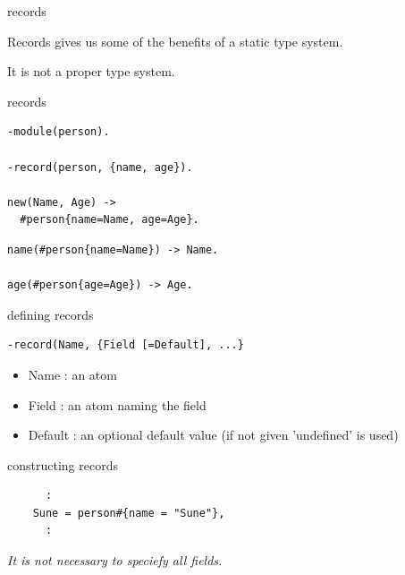 \begin{frame}{records}

\begin{center}
Records gives us some of the benefits of a static type system.
\end{center}
\pause\vspace{30pt}
\begin{center}
It is not a proper type system.
\end{center}
\end{frame}

\begin{frame}[fragile]{records}

\begin{verbatim}
-module(person).

-record(person, {name, age}).

new(Name, Age) ->
  #person{name=Name, age=Age}.
\end{verbatim}
\pause
\begin{verbatim}
name(#person{name=Name}) -> Name.

age(#person{age=Age}) -> Age.
\end{verbatim}

\end{frame} 

\begin{frame}[fragile]{defining records}

\begin{verbatim}
-record(Name, {Field [=Default], ...}
\end{verbatim}

\pause\vspace{20pt}
\begin{itemize}
\item Name : an atom 
\item Field : an atom naming the field
\item Default : an optional default value  (if not given 'undefined' is used)
\end{itemize}

\end{frame}

\begin{frame}[fragile]{constructing records}

\begin{verbatim}
      :
    Sune = person#{name = "Sune"},
      :
\end{verbatim}

\pause\vspace{20pt}
{\em It is not necessary to speciefy all fields.}
\end{frame}

